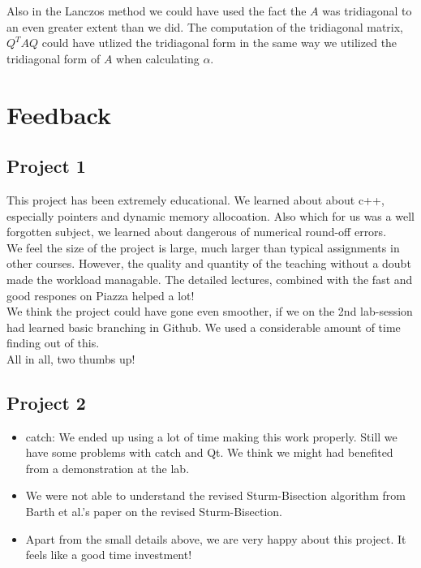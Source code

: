 \documentclass{article}
\begin{document}
Also in the Lanczos method we could have used the fact the $A$ was tridiagonal to an even greater extent than we did. The computation of the tridiagonal matrix, $Q^TAQ$ could have utlized the tridiagonal form in the same way we utilized the tridiagonal form of $A$ when calculating $\alpha$.





\section{Feedback}
\subsection{Project 1}
This project has been extremely educational. We learned about about c++, especially pointers and dynamic memory allocoation. Also which for us was a well forgotten subject, we learned about dangerous of numerical round-off errors. \\

We feel the size of the project is large, much larger than typical assignments in other courses. However, the quality and quantity of the teaching without a doubt made the workload managable. The detailed lectures, combined with the fast and good respones on Piazza helped a lot!\\

We think the project could have gone even smoother, if we on the 2nd lab-session had learned basic branching in Github. We used a considerable amount of time finding out of this.\\

All in all, two thumbs up!

\subsection{Project 2}
\begin{itemize}
	\item  catch: We ended up using a lot of time making this work properly. Still we have some problems with catch and Qt. We think we might had benefited from a demonstration at the lab.
	
	\item We were not able to understand the revised Sturm-Bisection algorithm from Barth et al.'s \cite{barth} paper on the revised Sturm-Bisection. 
	
	\item Apart from the small details above, we are very happy about this project. It feels like a good time investment!
\end{itemize}
\end{document}
